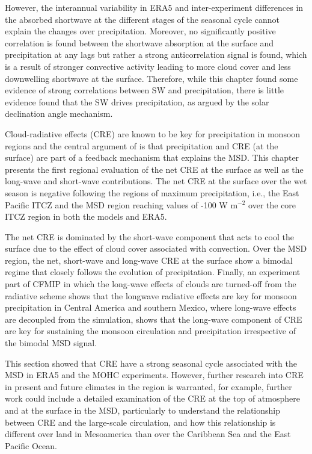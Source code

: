  However, the interannual variability in ERA5 and inter-experiment differences in the absorbed shortwave at the different stages of the seasonal cycle cannot explain the changes over precipitation. Moreover, no significantly positive correlation is found between the shortwave absorption at the surface and precipitation at any lags but rather a strong anticorrelation signal is found, which is a result of stronger convective activity leading to more cloud cover and less downwelling shortwave at the surface. 
 Therefore, while this chapter found some evidence of strong correlations between SW and precipitation, there is little evidence found that the SW drives precipitation, as argued by the solar declination angle mechanism.

Cloud-radiative effects (CRE) are known to be key for precipitation in monsoon regions and the central argument of \cite{magana1999} is that precipitation and CRE (at the surface) are part of a feedback mechanism that explains the MSD. This chapter presents the first regional evaluation of the net CRE at the surface as well as the long-wave and short-wave contributions. The net CRE at the surface over the wet season is negative following the regions of maximum precipitation, i.e., the East Pacific ITCZ and the MSD region reaching values of -100 W m$^{-2}$ over the core ITCZ region in both the models and ERA5.

 The net CRE is dominated by the short-wave component that acts to cool the surface due to the effect of cloud cover associated with convection. Over the MSD region, the net, short-wave and long-wave CRE at the surface show a bimodal regime that closely follows the evolution of precipitation. Finally, an experiment part of CFMIP in which the long-wave effects of clouds are turned-off from the radiative scheme shows that the longwave radiative effects are key for monsoon precipitation in Central America and southern Mexico,  where long-wave effects are decoupled from the simulation, shows that the long-wave component of CRE are key for sustaining the monsoon circulation and precipitation irrespective of the bimodal MSD signal.

This section showed that CRE have a strong seasonal cycle associated with the MSD in ERA5 and the MOHC experiments. However, further research into CRE in present and future climates in the region is warranted, for example, further work could include a detailed examination of the CRE at the top of atmosphere and at the surface in the MSD, particularly to understand the relationship between CRE and the large-scale circulation, and how this relationship is different over land in Mesoamerica than over the Caribbean Sea and the East Pacific Ocean.

